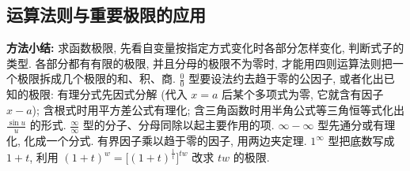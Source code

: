 \documentclass[UTF8,openany]{ctexbook}
\theoremstyle{chinesetextbook}
\begin{document}
\subsection{运算法则与重要极限的应用}
\par\indent\textbf{方法小结:} 求函数极限, 先看自变量按指定方式变化时各部分怎样变化, 判断式子的类型. 各部分都有有限的极限, 并且分母的极限不为零时, 才能用四则运算法则把一个极限拆成几个极限的和、积、商. $\displaystyle\frac00$ 型要设法约去趋于零的公因子, 或者化出已知的极限: 有理分式先因式分解 (代入 $x=a$ 后某个多项式为零, 它就含有因子 $x-a$); 含根式时用平方差公式有理化; 含三角函数时用半角公式等三角恒等式化出 $\displaystyle\frac{\sin u}u$ 的形式. $\displaystyle\frac\infty\infty$ 型的分子、分母同除以起主要作用的项. $\infty-\infty$ 型先通分或有理化, 化成一个分式. 有界因子乘以趋于零的因子, 用两边夹定理. $1^\infty$ 型把底数写成 $1+t$, 利用 $(1+t)^w=\bigl[(1+t)^{\frac1t}\bigr]^{tw}$ 改求 $tw$ 的极限.
\end{document}
